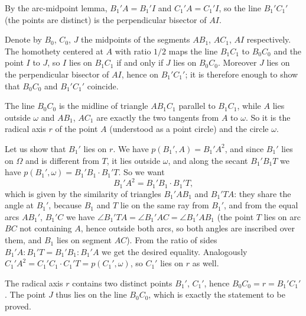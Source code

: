 {    By the arc-midpoint lemma, $B_1'A = B_1'I$ and $C_1'A = C_1'I$, so the line $B_1'C_1'$ (the points are distinct) is the perpendicular bisector of $AI$.

    Denote by $B_0$, $C_0$, $J$ the midpoints of the segments $AB_1$, $AC_1$, $AI$ respectively. The homothety centered at $A$ with ratio $1/2$ maps the line $B_1C_1$ to $B_0C_0$ and the point $I$ to $J$, so $I$ lies on $B_1C_1$ if and only if $J$ lies on $B_0C_0$. Moreover $J$ lies on the perpendicular bisector of $AI$, hence on $B_1'C_1'$; it is therefore enough to show that $B_0C_0$ and $B_1'C_1'$ coincide.

    The line $B_0C_0$ is the midline of triangle $AB_1C_1$ parallel to $B_1C_1$, while $A$ lies outside $\omega$ and $AB_1$, $AC_1$ are exactly the two tangents from $A$ to $\omega$. So it is the radical axis $r$ of the point $A$ (understood as a point circle) and the circle $\omega$.

    Let us show that $B_1'$ lies on $r$. We have $p(B_1',A) = B_1'A^2$, and since $B_1'$ lies on $\Omega$ and is different from $T$, it lies outside $\omega$, and along the secant $B_1'B_1T$ we have $p(B_1',\omega) = B_1'B_1 \cdot B_1'T$. So we want
    $$
    B_1'A^2 = B_1'B_1 \cdot B_1'T ,
    $$
    which is given by the similarity of triangles $B_1'AB_1$ and $B_1'TA$: they share the angle at $B_1'$, because $B_1$ and $T$ lie on the same ray from $B_1'$, and from the equal arcs $AB_1'$, $B_1'C$ we have $\angle B_1'TA = \angle B_1'AC = \angle B_1'AB_1$ (the point $T$ lies on arc $BC$ not containing $A$, hence outside both arcs, so both angles are inscribed over them, and $B_1$ lies on segment $AC$). From the ratio of sides $B_1'A : B_1'T = B_1'B_1 : B_1'A$ we get the desired equality. Analogously $C_1'A^2 = C_1'C_1 \cdot C_1'T = p(C_1',\omega)$, so $C_1'$ lies on $r$ as well.

    The radical axis $r$ contains two distinct points $B_1'$, $C_1'$, hence $B_0C_0 = r = B_1'C_1'$. The point $J$ thus lies on the line $B_0C_0$, which is exactly the statement to be proved.
}

